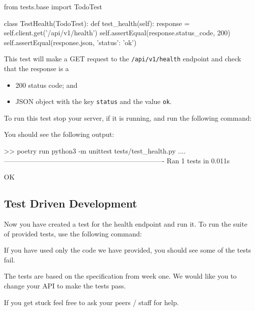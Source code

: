 \documentclass{csse4400}
\begin{document}
\begin{code}[language=python,numbers=none]{}
  from tests.base import TodoTest
  
  class TestHealth(TodoTest):
      def test_health(self):
          response = self.client.get('/api/v1/health')
          self.assertEqual(response.status_code, 200)
          self.assertEqual(response.json, {'status': 'ok'})

\end{code}

This test will make a GET request to the \texttt{/api/v1/health} endpoint and check that the response is a 
\begin{itemize}
  \item 200 status code; and
  \item JSON object with the key \texttt{status} and the value \texttt{ok}.
\end{itemize}

To run this test stop your server, if it is running, and run the following command:


You should see the following output:

\begin{code}[language=bash,numbers=none]{}
  >> poetry run python3 -m unittest tests/test_health.py
  ....
  ----------------------------------------------------------------------
  Ran 1 tests in 0.011s

  OK
\end{code}

\subsection{Test Driven Development}

Now you have created a test for the health endpoint and run it.
To run the suite of provided tests, use the following command:


If you have used only the code we have provided, you should see some of the tests fail.

The tests are based on the specification from week one.
We would like you to change your API to make the tests pass.


If you get stuck feel free to ask your peers / staff for help.
\end{document}
